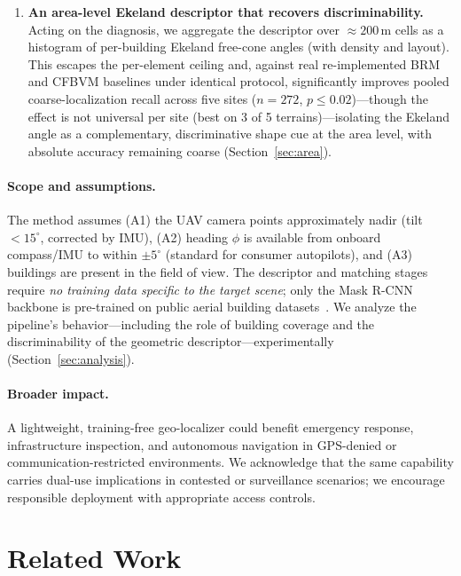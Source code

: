 \documentclass[10pt]{article}
\theoremstyle{plain}
\theoremstyle{definition}
\begin{document}
\begin{enumerate}
\item \textbf{An area-level Ekeland descriptor that recovers discriminability.}
      Acting on the diagnosis, we aggregate the descriptor over ${\approx}200$\,m
      cells as a histogram of per-building Ekeland free-cone angles (with density
      and layout). This escapes the per-element ceiling and, against real
      re-implemented BRM and CFBVM baselines under identical protocol,
      significantly improves pooled coarse-localization recall across five
      sites ($n{=}272$, $p{\le}0.02$)---though the effect is not universal per
      site (best on 3 of 5 terrains)---isolating the Ekeland angle as a
      complementary, discriminative shape cue at the area level, with absolute
      accuracy remaining coarse (Section~\ref{sec:area}).
\end{enumerate}

\paragraph{Scope and assumptions.}
The method assumes (A1) the UAV camera points approximately nadir (tilt
$<15^\circ$, corrected by IMU), (A2) heading $\phi$ is available from onboard
compass/IMU to within $\pm5^\circ$ (standard for consumer autopilots), and
(A3) buildings are present in the field of view.
The descriptor and matching stages require \emph{no training data specific to
the target scene}; only the Mask R-CNN backbone is pre-trained on public aerial
building datasets~\cite{ji2018building,fang2021building}.
We analyze the pipeline's behavior---including the role of building coverage
and the discriminability of the geometric descriptor---experimentally
(Section~\ref{sec:analysis}).

\paragraph{Broader impact.}
A lightweight, training-free geo-localizer could benefit emergency response,
infrastructure inspection, and autonomous navigation in GPS-denied or
communication-restricted environments.
We acknowledge that the same capability carries dual-use implications in
contested or surveillance scenarios; we encourage responsible deployment with
appropriate access controls.

\section{Related Work}
\label{sec:related}
\end{document}
